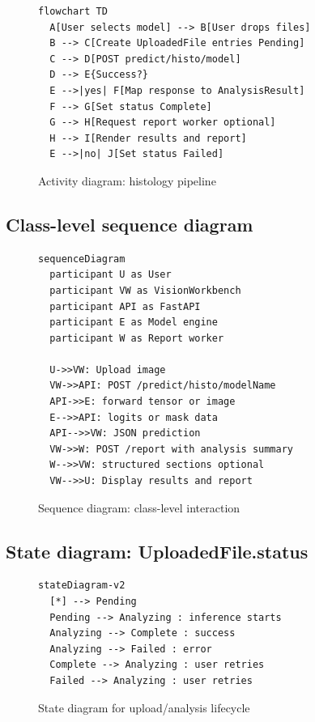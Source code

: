 \begin{figure}[htbp]
  \centering
  \begin{minipage}{0.92\textwidth}
  \begin{lstlisting}
flowchart TD
  A[User selects model] --> B[User drops files]
  B --> C[Create UploadedFile entries Pending]
  C --> D[POST predict/histo/model]
  D --> E{Success?}
  E -->|yes| F[Map response to AnalysisResult]
  F --> G[Set status Complete]
  G --> H[Request report worker optional]
  H --> I[Render results and report]
  E -->|no| J[Set status Failed]
  \end{lstlisting}
  \end{minipage}
  \caption{Activity diagram: histology pipeline}
\end{figure}

\subsection{Class-level sequence diagram}

\begin{figure}[htbp]
  \centering
  \begin{minipage}{0.92\textwidth}
  \begin{lstlisting}
sequenceDiagram
  participant U as User
  participant VW as VisionWorkbench
  participant API as FastAPI
  participant E as Model engine
  participant W as Report worker

  U->>VW: Upload image
  VW->>API: POST /predict/histo/modelName
  API->>E: forward tensor or image
  E-->>API: logits or mask data
  API-->>VW: JSON prediction
  VW->>W: POST /report with analysis summary
  W-->>VW: structured sections optional
  VW-->>U: Display results and report
  \end{lstlisting}
  \end{minipage}
  \caption{Sequence diagram: class-level interaction}
\end{figure}

\subsection{State diagram: UploadedFile.status}

\begin{figure}[htbp]
  \centering
  \begin{minipage}{0.92\textwidth}
  \begin{lstlisting}
stateDiagram-v2
  [*] --> Pending
  Pending --> Analyzing : inference starts
  Analyzing --> Complete : success
  Analyzing --> Failed : error
  Complete --> Analyzing : user retries
  Failed --> Analyzing : user retries
  \end{lstlisting}
  \end{minipage}
  \caption{State diagram for upload/analysis lifecycle}
\end{figure}

